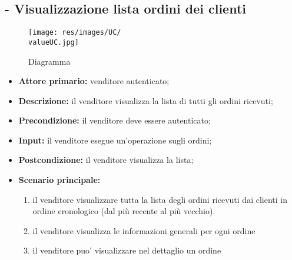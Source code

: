 \subsection{ - Visualizzazione lista ordini dei clienti}
\begin{figure}[H]
    \centering
    \texttt{[image: res/images/UC/\\valueUC.jpg]}
    \caption{Diagramma }
\end{figure}
\begin{itemize}
    \item \textbf{Attore primario:} venditore autenticato;
    \item \textbf{Descrizione:} il venditore visualizza la lista di tutti gli ordini ricevuti;
    \item \textbf{Precondizione:} il venditore deve essere autenticato;
    \item \textbf{Input:} il venditore esegue un'operazione sugli ordini;
    \item \textbf{Postcondizione:} il venditore visualizza la lista;
    \item \textbf{Scenario principale:}
          \begin{enumerate}
              \item il venditore visualizzare tutta la lista degli ordini ricevuti dai clienti in ordine cronologico (dal più recente al più vecchio).
              \item il venditore visualizza le informazioni generali per ogni ordine
              \item il venditore puo' visualizzare nel dettaglio un ordine
            \end{enumerate}
\end{itemize}

\stepsubUserCase

